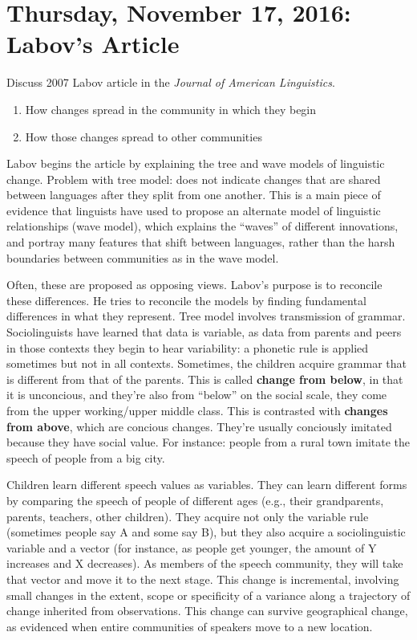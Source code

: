 \documentclass{exam}
\begin{document}
\section*{Thursday, November 17, 2016: Labov's Article}

Discuss 2007 Labov article in the \textit{Journal of American Linguistics}.
\begin{enumerate}
    \item How changes spread in the community in which they begin
    \item How those changes spread to other communities
\end{enumerate}

\noindent Labov begins the article by explaining the tree and wave models of linguistic change. 
Problem with tree model: does not indicate changes that are shared between languages after they split from one another. 
This is a main piece of evidence that linguists have used to propose an alternate model of linguistic relationships (wave model), which explains the ``waves'' of different innovations, and portray many features that shift between languages, rather than the harsh boundaries between communities as in the wave model. 

Often, these are proposed as opposing views. Labov's purpose is to reconcile these differences. 
He tries to reconcile the models by finding fundamental differences in what they represent. 
Tree model involves transmission of grammar. 
Sociolinguists have learned that data is variable, as data from parents and peers in those contexts they begin to hear variability: a phonetic rule is applied sometimes but not in all contexts.
Sometimes, the children acquire grammar that is different from that of the parents.
This is called \textbf{change from below}, in that it is unconcious, and they're also from ``below'' on the social scale, they come from the upper working/upper middle class.
This is contrasted with \textbf{changes from above}, which are concious changes. They're usually conciously imitated because they have social value.
For instance: people from a rural town imitate the speech of people from a big city. 

Children learn different speech values as variables. They can learn different forms by comparing the speech of people of different ages (e.g., their grandparents, parents, teachers, other children). 
They acquire not only the variable rule (sometimes people say A and some say B), but they also acquire a sociolinguistic variable and a vector (for instance, as people get younger, the amount of Y increases and X decreases). 
As members of the speech community, they will take that vector and move it to the next stage.
This change is incremental, involving small changes in the extent, scope or specificity of a variance along a trajectory of change inherited from observations. 
This change can survive geographical change, as evidenced when entire communities of speakers move to a new location. 
\end{document}
